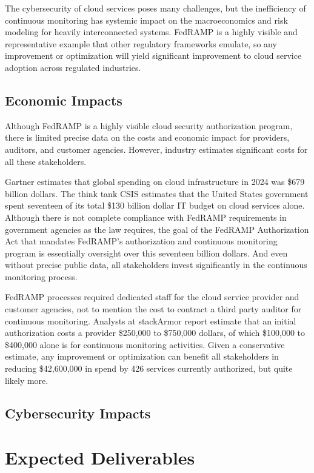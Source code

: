 \documentclass{jdf}
\begin{document}
The cybersecurity of cloud services poses many challenges, but the inefficiency of continuous monitoring has systemic impact on the macroeconomics and risk modeling for heavily interconnected systems. FedRAMP is a highly visible and representative example that other regulatory frameworks emulate, so any improvement or optimization will yield significant improvement to cloud service adoption across regulated industries.

\subsection{Economic Impacts}

Although FedRAMP is a highly visible cloud security authorization program, there is limited precise data on the costs and economic impact for providers, auditors, and customer agencies. However, industry estimates significant costs for all these stakeholders.

Gartner estimates that global spending on cloud infrastructure in 2024 was \$679 billion dollars. The think tank CSIS estimates that the United States government spent seventeen of its total \$130 billion dollar IT budget on cloud services alone. Although there is not complete compliance with FedRAMP requirements in government agencies as the law requires, the goal of the FedRAMP Authorization Act that mandates FedRAMP's authorization and continuous monitoring program is essentially oversight over this seventeen billion dollars. And even without precise public data, all stakeholders invest significantly in the continuous monitoring process.

FedRAMP processes required dedicated staff for the cloud service provider and customer agencies, not to mention the cost to contract a third party auditor for continuous monitoring. Analysts at stackArmor report estimate that an initial authorization costs a provider \$250,000 to \$750,000 dollars, of which \$100,000 to \$400,000 alone is for continuous monitoring activities. Given a conservative estimate, any improvement or optimization can benefit all stakeholders in reducing \$42,600,000 in spend by 426 services currently authorized, but quite likely more. 

\subsection{Cybersecurity Impacts}


\section{Expected Deliverables}
\end{document}
